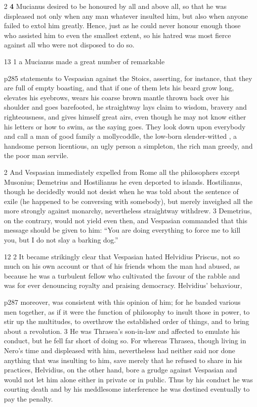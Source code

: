 2 \textbf{4} Mucianus desired to be honoured by all and above all, so that he was displeased not only when any man whatever insulted him, but also when anyone failed to extol him greatly. Hence, just as he could never honour enough those who assisted him to even the smallest extent, so his hatred was most fierce against all who were not disposed to do so.

13
1 a Mucianus made a great number of remarkable

p285 statements to Vespasian against the Stoics, asserting, for instance, that they are full of empty boasting, and that if one of them lets his beard grow long, elevates his eyebrows, wears his coarse brown mantle thrown back over his shoulder and goes barefooted, he straightway lays claim to wisdom, bravery and righteousness, and gives himself great airs, even though he may not know either his letters or how to swim, as the saying goes. They look down upon everybody and call a man of good family a mollycoddle, the low-born slender-witted , a handsome person licentious, an ugly person a simpleton, the rich man greedy, and the poor man servile.

2
And Vespasian immediately expelled from Rome all the philosophers except Musonius; Demetrius and Hostilianus he even deported to islands. Hostilianus, though he decidedly would not desist when he was told about the sentence of exile (he happened to be conversing with somebody), but merely inveighed all the more strongly against monarchy, nevertheless straightway withdrew. 3 Demetrius, on the contrary, would not yield even then, and Vespasian commanded that this message should be given to him: ``You are doing everything to force me to kill you, but I do not slay a barking dog.''

12
2 It became strikingly clear that Vespasian hated Helvidius Priscus, not so much on his own account or that of his friends whom the man had abused, as because he was a turbulent fellow who cultivated the favour of the rabble and was for ever denouncing royalty and praising democracy. Helvidius' behaviour,

p287 moreover, was consistent with this opinion of him; for he banded various men together, as if it were the function of philosophy to insult those in power, to stir up the multitudes, to overthrow the established order of things, and to bring about a revolution. 3 He was Thrasea's son-in\texthebrew{‑}law and affected to emulate his conduct, but he fell far short of doing so. For whereas Thrasea, though living in Nero's time and displeased with him, nevertheless had neither said nor done anything that was insulting to him, save merely that he refused to share in his practices, Helvidius, on the other hand, bore a grudge against Vespasian and would not let him alone either in private or in public. Thus by his conduct he was courting death and by his meddlesome interference he was destined eventually to pay the penalty.

